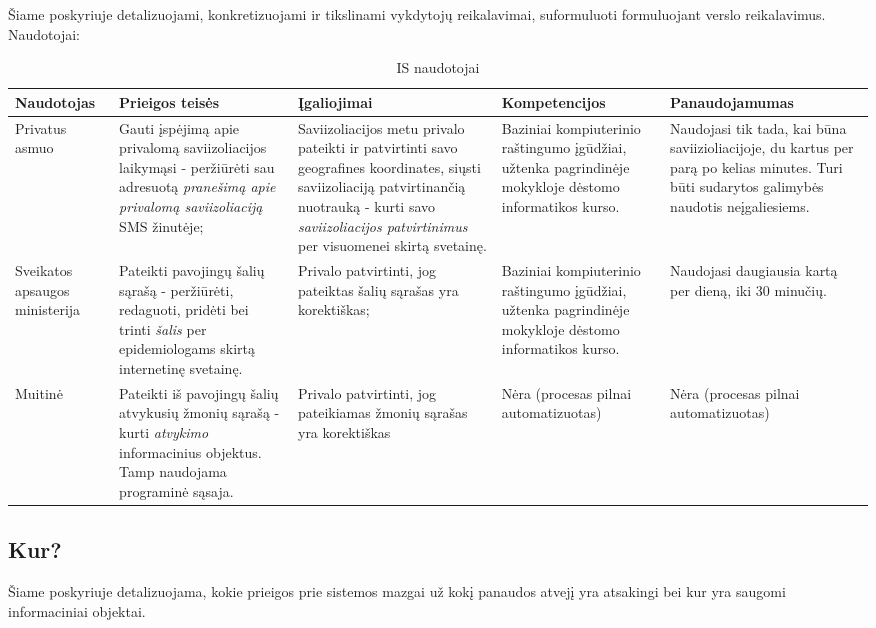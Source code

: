 \documentclass{VUMIFPSkursinis}
\begin{document}
Šiame poskyriuje detalizuojami, konkretizuojami ir tikslinami vykdytojų reikalavimai, suformuluoti formuluojant verslo reikalavimus. Naudotojai:
\begin{center}
	\small
	\begin{longtable}{|L{2cm}|C{3cm}|C{3cm}|C{3cm}|C{3cm}|}
		\caption{IS naudotojai}
		\label{table:users}
		\\ \hline
		Naudotojas & Prieigos teisės & Įgaliojimai & Kompetencijos & Panaudojamumas \\ \hline
		Privatus asmuo & Gauti įspėjimą apie privalomą saviizoliacijos laikymąsi - peržiūrėti sau adresuotą \emph{pranešimą apie privalomą saviizoliaciją} SMS žinutėje; & Saviizoliacijos metu privalo pateikti ir patvirtinti savo geografines koordinates, siųsti saviizoliaciją patvirtinančią nuotrauką - kurti savo \emph{saviizoliacijos patvirtinimus} per visuomenei skirtą svetainę. & Baziniai kompiuterinio raštingumo įgūdžiai, užtenka pagrindinėje mokykloje dėstomo informatikos kurso. & Naudojasi tik tada, kai būna saviizioliacijoje, du kartus per parą po kelias minutes. Turi būti sudarytos galimybės naudotis neįgaliesiems. \\ \hline
		Sveikatos apsaugos ministerija & Pateikti pavojingų šalių sąrašą - peržiūrėti, redaguoti, pridėti bei trinti \emph{šalis} per epidemiologams skirtą internetinę svetainę. & Privalo patvirtinti, jog pateiktas šalių sąrašas yra korektiškas; & Baziniai kompiuterinio raštingumo įgūdžiai, užtenka pagrindinėje mokykloje dėstomo informatikos kurso. & Naudojasi daugiausia kartą per dieną, iki 30 minučių. \\ \hline
		Muitinė & Pateikti iš pavojingų šalių atvykusių žmonių sąrašą - kurti \emph{atvykimo} informacinius objektus. Tamp naudojama programinė sąsaja. & Privalo patvirtinti, jog pateikiamas žmonių sąrašas yra korektiškas & Nėra (procesas pilnai automatizuotas) & Nėra (procesas pilnai automatizuotas)                                     \\ \hline
	\end{longtable}
\end{center}

\subsection{Kur?}\label{sec:vartotojoReqWhere}
Šiame poskyriuje detalizuojama, kokie prieigos prie sistemos mazgai už kokį panaudos atvejį yra atsakingi bei kur yra saugomi informaciniai objektai.
\end{document}
